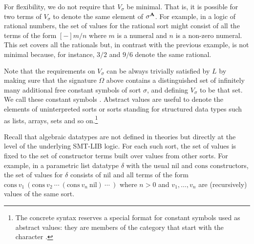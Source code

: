 For flexibility, we do not require that $V_\sigma$ be minimal.
That is, it is possible for two terms of $V_\sigma$ to denote 
the same element of $\sigma^{\mathbf{A}}$.
For example,
in a logic of rational numbers, the set of values for the rational sort
might consist of all the terms of the form $[-]m/n$
where $m$ is a numeral and $n$ is a non-zero numeral.
This set covers all the rationals 
but, in contrast with the previous example, is not minimal
because, for instance, $3/2$ and $9/6$ denote the same rational.

Note that the requirements on $V_\sigma$ can be always trivially satisfied 
by $L$ by making sure that the signature
$\Omega$ above contains 
a distinguished set of infinitely many additional free constant symbols of 
sort $\sigma$,
and defining $V_\sigma$ to be that set.
We call these constant symbols .
Abstract values are useful to denote the elements of uninterpreted  
sorts or sorts standing for structured data types
such as lists, arrays, sets and so on.\footnote{%
The concrete syntax reserves a special format for constant symbols 
used as abstract values: 
they are members of the  category 
that start with the character .
}

Recall that algebraic datatypes are not defined in theories but directly 
at the level of the underlying SMT-LIB logic. 
For each such sort, the set of values is fixed to the set 
of constructor terms built over values from other sorts.
For example, in a parametric list datatype $\delta$ 
with the usual $\mathrm{nil}$ and $\mathrm{cons}$ constructors,
the set of values for $\delta$ consists of $\mathrm{nil}$ and 
all terms of the form 
$\mathrm{cons}\ v_1\ (\mathrm{cons}\ v_2\ \cdots\ (\mathrm{cons}\ v_n\ \mathrm{nil})\ \cdots\ )$
where $n > 0$ and 
$v_1, \ldots, v_n$ are (recursively) values of the same sort.






